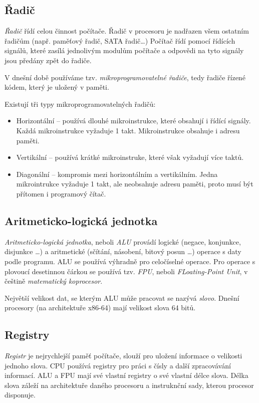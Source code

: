 \documentclass[a4paper]{article}
\begin{document}
    \subsection{Řadič}
        \textit{Řadič} řídí celou činnost počítače. Řadič v procesoru je nadřazen všem ostatním řadičům (např. paměťový řadič, SATA řadič\dots)
        Počítač řídí pomocí řídících signálů, které zasílá jednolivým modulům počítače a odpovědi na tyto signály jsou předány zpět do řadiče. \par
        V dnešní době používáme tzv. \textit{mikroprogramovatelné řadiče}, tedy řadiče řízené kódem, který je uložený v paměti. \par
        Existují tři typy mikroprogramovatelných řadičů:
        \begin{itemize}
            \item Horizontální -- používá dlouhé mikroinstrukce, které obsahují i řídící signály. Každá mikroinstrukce vyžaduje 1 takt. Mikroinstrukce obsahuje i adresu paměti.
            \item Vertikální -- používá krátké mikroinstruke, které však vyžadují více taktů.
            \item Diagonální -- kompromis mezi horizontálním a vertikálním. Jedna mikrointrukce vyžaduje 1 takt, ale neobsahuje adresu paměti, proto musí být přítomen i programový čítač.
        \end{itemize}
    \subsection{Aritmeticko-logická jednotka}
        \textit{Aritmeticko-logická jednotka}, neboli \textit{ALU} provádí logické (negace, konjunkce, disjunkce \dots) a aritmetické (sčítání, násobení, bitový posun \dots) operace s daty podle programu. ALU se používá výhradně pro celočíselné operace. Pro operace s plovoucí desetinnou čárkou se používá tzv. \textit{FPU}, neboli \textit{FLoating-Point Unit}, v češtině \textit{matematický koprocesor}. \par
        Největší velikost dat, se kterým ALU může pracovat se nazývá \textit{slovo}. Dnešní procesory (na architektuře x86-64) mají velikost slova 64 bitů.
    \subsection{Registry}
        \textit{Registr} je nejrychlejší paměť počítače, slouží pro uložení informace o velikosti jednoho slova. CPU používá registry pro práci s čísly a další zpracovávání informací. ALU a FPU mají své vlastní registry o své vlastní délce slova. Délka slova záleží na architektuře daného procesoru a instruknční sady, kterou procesor disponuje.
\end{document}

